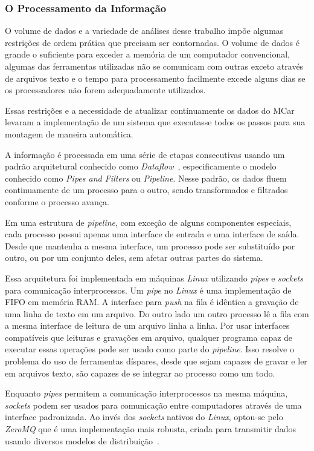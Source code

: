 \documentclass[12pt,a4paper]{article}
\theoremstyle{hypo}
\begin{document}
\subsubsection{O Processamento da Informação}

O volume de dados e a variedade de análises desse trabalho impõe algumas restrições de ordem prática que precisam ser contornadas. O volume de dados é grande o suficiente para exceder a memória de um computador convencional, algumas das ferramentas utilizadas não se comunicam com outras exceto através de arquivos texto e o tempo para processamento facilmente excede alguns dias se os processadores não forem adequadamente utilizados.

Essas restrições e a necessidade de atualizar continuamente os dados do MCar levaram a implementação de um sistema que executasse todos os passos para sua montagem de maneira automática.

A informação é processada em uma série de etapas consecutivas usando um padrão arquitetural conhecido como \textit{Dataflow}~\cite{Carkci2014-jk, Hohpe2003-nj}, especificamente o modelo conhecido como \textit{Pipes and Filters} ou \textit{Pipeline}. Nesse padrão, os dados fluem continuamente de um processo para o outro, sendo transformados e filtrados conforme o processo avança. 

Em uma estrutura de \textit{pipeline}, com exceção de alguns componentes especiais, cada processo possui apenas uma interface de entrada e uma interface de saída. Desde que mantenha a mesma interface, um processo pode ser substituído por outro, ou por um conjunto deles, sem afetar outras partes do sistema.

Essa arquitetura foi implementada em máquinas \textit{Linux} utilizando \textit{pipes} e \textit{sockets} para comunicação interprocessos. Um \textit{pipe} no \textit{Linux} é uma implementação de FIFO em memória RAM. A interface para \textit{push} na fila é idêntica a gravação de uma linha de texto em um arquivo. Do outro lado um outro processo lê a fila com a mesma interface de leitura de um arquivo linha a linha. Por usar interfaces compatíveis que leituras e gravações em arquivo, qualquer programa capaz de executar essas operações pode ser usado como parte do \textit{pipeline}. Isso resolve o problema do uso de ferramentas díspares, desde que sejam capazes de gravar e ler em arquivos texto, são capazes de se integrar ao processo como um todo.

Enquanto \textit{pipes} permitem a comunicação interprocessos na mesma máquina, \textit{sockets} podem ser usados para comunicação entre computadores através de uma interface padronizada. Ao invés dos \textit{sockets} nativos do \textit{Linux}, optou-se pelo \textit{ZeroMQ} que é uma implementação mais robusta, criada para transmitir dados usando diversos modelos de distribuição~\cite{Hintjens2013-tz}.
\end{document}
